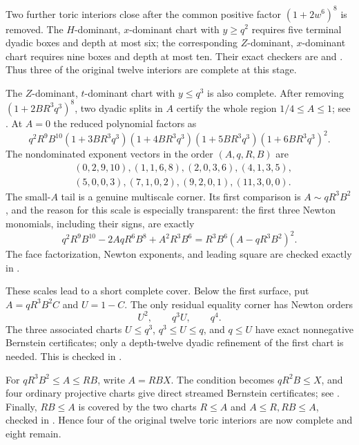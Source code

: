 \documentclass[11pt]{article}
\theoremstyle{remark}
\begin{document}
Two further toric interiors close after the common positive factor
\((1+2w^6)^8\) is removed.  The \(H\)-dominant, \(x\)-dominant chart with
\(y\geq q^2\) requires five terminal dyadic boxes and depth at most six; the
corresponding \(Z\)-dominant, \(x\)-dominant chart requires nine boxes and
depth at most ten.  Their exact checkers are
 and
.  Thus three of the
original twelve interiors are complete at this stage.

The \(Z\)-dominant, \(t\)-dominant chart with \(y\leq q^3\) is also
complete.  After removing
\((1+2BR^3q^3)^8\), two dyadic splits in \(A\) certify the whole region
\(1/4\leq A\leq1\); see
.  At \(A=0\)
the reduced polynomial factors as
\[
 q^2R^9B^{10}(1+3BR^3q^3)(1+4BR^3q^3)
 (1+5BR^3q^3)(1+6BR^3q^3)^2.
\]
The nondominated exponent vectors in the order \((A,q,R,B)\) are
\[
\begin{split}
 &(0,2,9,10),(1,1,6,8),(2,0,3,6),(4,1,3,5),\\
 &(5,0,0,3),(7,1,0,2),(9,2,0,1),(11,3,0,0).
\end{split}
\]
The small-\(A\) tail is a genuine multiscale corner.  Its first comparison
is \(A\sim qR^3B^2\), and the reason for this scale is especially
transparent: the first three Newton monomials, including their signs, are
exactly
\[
 q^2R^9B^{10}-2AqR^6B^8+A^2R^3B^6
   =R^3B^6(A-qR^3B^2)^2.
\]
The face factorization, Newton exponents, and leading square are checked
exactly in
.

These scales lead to a short complete cover.  Below the first surface, put
\(A=qR^3B^2C\) and \(U=1-C\).  The only residual equality corner has Newton
orders
\[
                 U^2,\qquad q^3U,\qquad q^4.
\]
The three associated charts \(U\leq q^3\),
\(q^3\leq U\leq q\), and \(q\leq U\) have exact nonnegative Bernstein
certificates; only a depth-twelve dyadic refinement of the first chart is
needed.  This is checked in
.

For \(qR^3B^2\leq A\leq RB\), write \(A=RBX\).  The condition becomes
\(qR^2B\leq X\), and four ordinary projective charts give direct streamed
Bernstein certificates; see
.  Finally,
\(RB\leq A\) is covered by the two charts \(R\leq A\) and
\(A\leq R, RB\leq A\), checked in
.  Hence four
of the original twelve toric interiors are now complete and eight remain.
\end{document}
